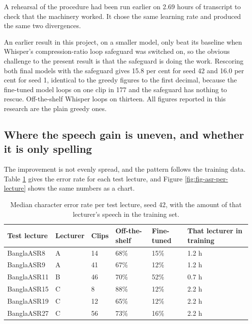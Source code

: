 A rehearsal of the procedure had been run earlier on 2.69 hours of transcript to check
that the machinery worked. It chose the same learning rate and produced the same two
divergences.

An earlier result in this project, on a smaller model, only beat its baseline when
Whisper's compression-ratio loop safeguard was switched on, so the obvious challenge to
the present result is that the safeguard is doing the work. Rescoring both final models
with the safeguard gives 15.8 per cent for seed 42 and 16.0 per cent for seed 1, identical
to the greedy figures to the first decimal, because the fine-tuned model loops on one clip
in 177 and the safeguard has nothing to rescue. Off-the-shelf Whisper loops on thirteen.
All figures reported in this research are the plain greedy ones.

\subsection{Where the speech gain is uneven, and whether it is only spelling}
\label{sec:asr-spelling}

The improvement is not evenly spread, and the pattern follows the training data.
Table \ref{tab:perlecture} gives the error rate for each test lecture, and Figure
\ref{fig:fig-asr-per-lecture} shows the same numbers as a chart.

\begin{table}[htbp]
\centering
\caption[Median character error rate per test lecture, seed 42]{Median character error rate per test lecture, seed 42, with the amount of that
lecturer's speech in the training set.}
\label{tab:perlecture}
\small
\begin{tabular}{p{2.8cm}p{1.8cm}p{1.4cm}p{2.4cm}p{2.0cm}p{2.6cm}}
\toprule
Test lecture & Lecturer & Clips & Off-the-shelf & Fine-tuned &
That lecturer in training \\
\midrule
BanglaASR8 & A & 14 & 68\% & 15\% & 1.2 h \\
BanglaASR9 & A & 41 & 67\% & 12\% & 1.2 h \\
BanglaASR11 & B & 46 & 70\% & 52\% & 0.7 h \\
BanglaASR15 & C & 8 & 88\% & 12\% & 2.2 h \\
BanglaASR19 & C & 12 & 65\% & 12\% & 2.2 h \\
BanglaASR27 & C & 56 & 73\% & 16\% & 2.2 h \\
\bottomrule
\end{tabular}
\end{table}

